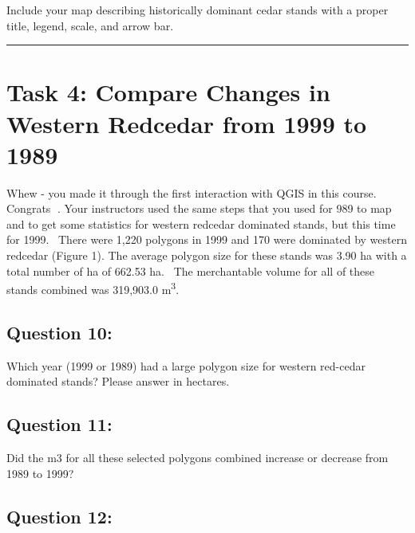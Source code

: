 \documentclass[
  letterpaper,
]{book}
\begin{document}
Include your map describing historically dominant cedar stands with a
proper title, legend, scale, and arrow bar.

\begin{center}\rule{0.5\linewidth}{0.5pt}\end{center}

\hypertarget{task-4-compare-changes-in-western-redcedar-from-1999-to-1989}{%
\section*{Task 4: Compare Changes in Western Redcedar from 1999 to
1989}\label{task-4-compare-changes-in-western-redcedar-from-1999-to-1989}}


Whew - you made it through the first interaction with QGIS in this
course. Congrats 🎉. Your instructors used the same steps that you used
for 989 to map and to get some statistics for western redcedar dominated
stands, but this time for 1999.~ There were 1,220 polygons in 1999 and
170 were dominated by western redcedar (Figure 1). The average polygon
size for these stands was 3.90 ha with a total number of ha of 662.53
ha. ~The merchantable volume for all of these stands combined was
319,903.0 m\textsuperscript{3}.

\hypertarget{question-10}{%
\subsection*{Question 10:}\label{question-10}}

Which year (1999 or 1989) had a large polygon size for western red-cedar
dominated stands? Please answer in hectares.

\hypertarget{question-11}{%
\subsection*{Question 11:}\label{question-11}}

Did the m3 for all these selected polygons combined increase or decrease
from 1989 to 1999?

\hypertarget{question-12}{%
\subsection*{Question 12:}\label{question-12}}
\end{document}
